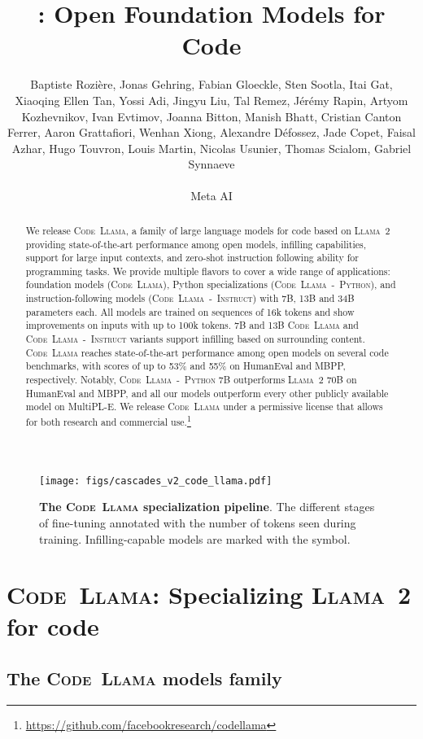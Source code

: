 \documentclass[10pt]{article}
\title{\model: Open Foundation Models for Code}
\author{\name Baptiste Rozi\`{e}re,
Jonas Gehring,
Fabian Gloeckle, 
Sten Sootla, 
Itai Gat, 
Xiaoqing Ellen Tan, 
Yossi Adi, 
Jingyu Liu, 
Tal Remez, 
J\'{e}r\'{e}my Rapin,
Artyom Kozhevnikov, 
Ivan Evtimov, 
Joanna Bitton,
Manish Bhatt,
Cristian Canton Ferrer,
Aaron Grattafiori,
Wenhan Xiong, 
Alexandre D\'{e}fossez,
Jade Copet,
Faisal Azhar,
Hugo Touvron, 
Louis Martin, 
Nicolas Usunier,
Thomas Scialom,
Gabriel Synnaeve
\\ \\
\hspace*{0pt}\hfill Meta AI
}
\newcommand{\model}{\textsc{Code~Llama}\xspace}
\newcommand{\basemodel}{\textsc{Code~Llama}\xspace}
\newcommand{\instmodel}{\textsc{Code~Llama~-~Instruct}\xspace}
\newcommand{\pymodel}{\textsc{Code~Llama~-~Python}\xspace}
\newcommand{\llamavtwo}{\textsc{Llama~2}\xspace}
\begin{document}
\maketitle

\begin{abstract}

We release \model, a family of large language models for code based on \llamavtwo providing state-of-the-art performance among open models, infilling capabilities, support for large input contexts, and zero-shot instruction following ability for programming tasks.
We provide multiple flavors to cover a wide range of applications: foundation models (\basemodel), Python specializations (\pymodel), and instruction-following models (\instmodel) with 7B, 13B and 34B parameters each.
All models are trained on sequences of 16k tokens and show improvements on inputs with up to 100k tokens.
7B and 13B \basemodel and \instmodel variants support infilling based on surrounding content.
\model reaches state-of-the-art performance among open models on several code benchmarks, with scores of up to 53\% and 55\% on HumanEval and MBPP, respectively.
Notably, \pymodel 7B outperforms \llamavtwo 70B on HumanEval and MBPP, and all our models outperform every other publicly available model on MultiPL-E.
We release \model under a permissive license that allows for both research and commercial use.\footnote{
\url{https://github.com/facebookresearch/codellama}}
\end{abstract}


\begin{figure}[t!]
    \centering
    \texttt{[image: figs/cascades\_v2\_code\_llama.pdf]}
    \caption{\textbf{The \model specialization pipeline}. 
    The different stages of fine-tuning annotated with the number of tokens seen during training.
    Infilling-capable models are marked with the  symbol.\label{fig:training_order}}
\end{figure}

\section{\model: Specializing \llamavtwo for code}
\label{sec:method}

\subsection{The \model models family}
\end{document}
